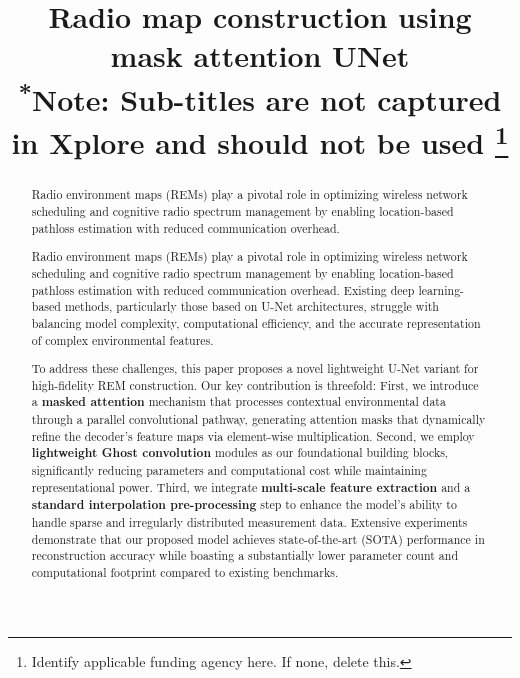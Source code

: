\documentclass[conference]{IEEEtran}
\begin{document}
\title{Radio map construction using mask attention UNet\\
{\footnotesize \textsuperscript{*}Note: Sub-titles are not captured in Xplore and
should not be used}
\thanks{Identify applicable funding agency here. If none, delete this.}
}
\author{
}

\maketitle

\begin{abstract}




Radio environment maps (REMs) play a pivotal role in optimizing wireless network 
scheduling and cognitive radio spectrum management by enabling location-based pathloss 
estimation with reduced communication overhead.

Radio environment maps (REMs) play a pivotal role in optimizing wireless network scheduling and cognitive 
radio spectrum management by enabling location-based pathloss estimation with reduced communication overhead. 
Existing deep learning-based methods, particularly those based on U-Net architectures, struggle with balancing 
model complexity, computational efficiency, and the accurate representation of complex environmental features. 

To address these challenges, this paper proposes a novel lightweight U-Net variant for high-fidelity REM construction. 
Our key contribution is threefold: First, we introduce a \textbf{masked attention} mechanism that processes contextual 
environmental data through a parallel convolutional pathway, generating attention masks that dynamically refine the decoder's 
feature maps via element-wise multiplication. Second, we employ \textbf{lightweight Ghost convolution} modules as our foundational
 building blocks, significantly reducing parameters and computational cost while maintaining representational power. 
 Third, we integrate \textbf{multi-scale feature extraction} and a \textbf{standard interpolation pre-processing} step to enhance 
 the model's ability to handle sparse and irregularly distributed measurement data. Extensive experiments demonstrate that our proposed 
 model achieves state-of-the-art (SOTA) performance in reconstruction accuracy while boasting a substantially lower parameter count and 
 computational footprint compared to existing benchmarks.
\end{abstract}
\end{document}
